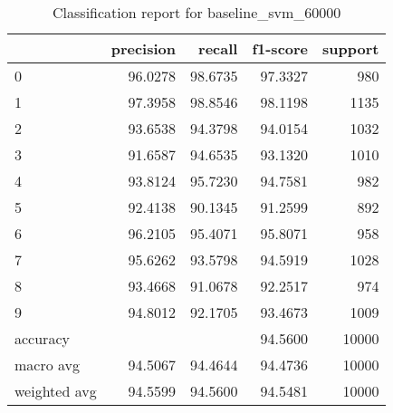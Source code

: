 \begin{table}[htb!]
\centering
\begin{tabular}{lrrrr}
    \toprule
    & precision & recall & f1-score & support \\
    \midrule
    0 & 96.0278 & 98.6735 & 97.3327 & 980 \\
    1 & 97.3958 & 98.8546 & 98.1198 & 1135 \\
    2 & 93.6538 & 94.3798 & 94.0154 & 1032 \\
    3 & 91.6587 & 94.6535 & 93.1320 & 1010 \\
    4 & 93.8124 & 95.7230 & 94.7581 & 982 \\
    5 & 92.4138 & 90.1345 & 91.2599 & 892 \\
    6 & 96.2105 & 95.4071 & 95.8071 & 958 \\
    7 & 95.6262 & 93.5798 & 94.5919 & 1028 \\
    8 & 93.4668 & 91.0678 & 92.2517 & 974 \\
    9 & 94.8012 & 92.1705 & 93.4673 & 1009 \\
    accuracy & & & 94.5600 & 10000\\
    macro avg & 94.5067 & 94.4644 & 94.4736 & 10000 \\
    weighted avg & 94.5599 & 94.5600 & 94.5481 & 10000 \\
    \bottomrule
\end{tabular}
\caption{Classification report for baseline\_svm\_60000}
\label{tab:classification-report-baseline_svm_60000}
\end{table}
